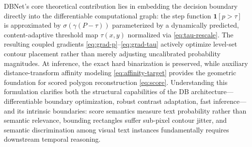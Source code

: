 \documentclass[11pt,a4paper]{article}
\newcommand{\1}{\mathbf{1}}
\begin{document}
DBNet's core theoretical contribution lies in embedding the decision boundary directly into the differentiable computational graph: the step function $\1[p > \tau]$ is approximated by $\sigma(\gamma(P - \tau))$ parameterized by a dynamically predicted, content-adaptive threshold map $\tau(x,y)$ normalized via \eqref{eq:tau-rescale}. The resulting coupled gradients \eqref{eq:grad-p}--\eqref{eq:grad-tau} actively optimize level-set contour placement rather than merely adjusting uncalibrated probability magnitudes. At inference, the exact hard binarization is preserved, while auxiliary distance-transform affinity modeling \eqref{eq:affinity-target} provides the geometric foundation for scored polygon reconstruction \eqref{eq:score}. Understanding this formulation clarifies both the structural capabilities of the DB architecture---differentiable boundary optimization, robust contrast adaptation, fast inference---and its intrinsic boundaries: score semantics measure text probability rather than semantic relevance, bounding rectangles suffer sub-pixel contour jitter, and semantic discrimination among visual text instances fundamentally requires downstream temporal reasoning.
\end{document}
